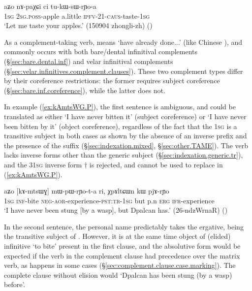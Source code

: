 \begin{exe}
\ex \label{ex:tukWsWrYoa}
 \gll aʑo nɤ-paχɕi ci tu-kɯ-sɯ-rɲo-a \\
 \textsc{1sg} \textsc{2sg}.\textsc{poss}-apple a.little \textsc{ipfv}-2\fl{}1-\textsc{caus}-taste-\textsc{1sg} \\
 \glt `Let me taste your apples.' (150904 zhongli-zh)
 ()
\end{exe}    
    
As a complement-taking verb,  means `have already done...' (like Chinese  ), and commonly occurs with both bare/dental infinitival complements (§\ref{sec:bare.dental.inf}) and velar infinitival complements (§\ref{sec:velar.infinitives.complement.clauses}). These two complement types differ by their coreference restrictions: the former requires subject coreference (§\ref{sec:bare.inf.coreference}), while the latter does not.


In example (\ref{ex:kAmtsWG.P}), the first sentence  is ambiguous, and could be translated as either `I have never bitten it' (subject coreference) or `I have never been bitten by it' (object coreference), regardless of the fact that the \textsc{1sg} is a transitive subject in both cases as shown by the absence of an inverse prefix and the presence of the  suffix (§\ref{sec:indexation.mixed}, §\ref{sec:other.TAME}). The verb  lacks inverse forms other than the generic subject (§\ref{sec:indexation.generic.tr}), and the 3\fl{}\textsc{1sg} inverse form $\dagger$ is rejected, and cannot be used to replace   in (\ref{ex:kAmtsWG.P}).

\begin{exe}
\ex   \label{ex:kAmtsWG.P} 
\gll aʑo [kɤ-mtsɯɣ] mɯ-pɯ-rɲo-t-a ri, χpɤltɕɯn kɯ pjɤ-rɲo  \\
\textsc{1sg} \textsc{inf}-bite \textsc{neg}-\textsc{aor}-experience-\textsc{pst}:\textsc{tr}-\textsc{1sg} but p.n \textsc{erg}  \textsc{ifr}-experience \\
\glt `I have never been stung [by a wasp], but Dpalcan has.' (26-ndzWrnaR) 
()
\end{exe}  
 
In the second sentence, the personal name  predictably takes the ergative, being the transitive subject of . However, it is at the same time object of (elided) infinitive  `to bite' present in the first clause, and the absolutive form would be expected if the verb in the complement clause had precedence over the matrix verb, as happens in some cases (§\ref{sec:complement.clause.case.marking}). The complete clause without elision would  `Dpalcan has been stung (by a wasp) before'.


